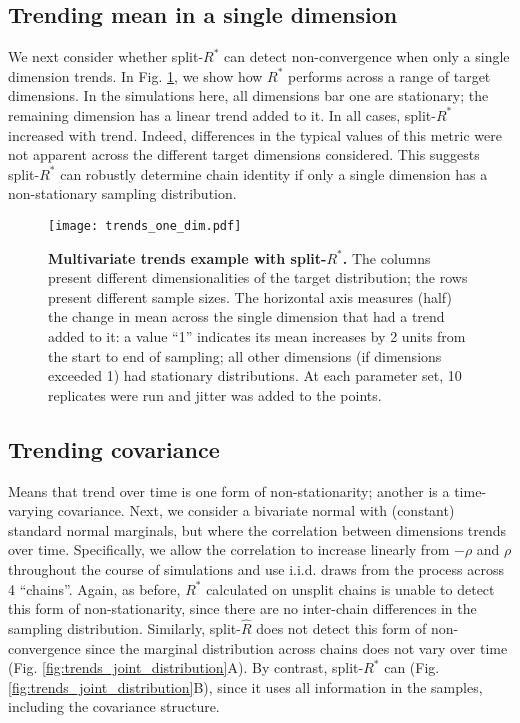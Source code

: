 \documentclass{article}
\begin{document}
\subsection{Trending mean in a single dimension}\label{sec:non-stationary_single}
We next consider whether split-$R^*$ can detect non-convergence when only a single dimension trends. In Fig. \ref{fig:trends_one_dim}, we show how $R^*$ performs across a range of target dimensions. In the simulations here, all dimensions bar one are stationary; the remaining dimension has a linear trend added to it. In all cases, split-$R^*$ increased with trend. Indeed, differences in the typical values of this metric were not apparent across the different target dimensions considered. This suggests split-$R^*$ can robustly determine chain identity if only a single dimension has a non-stationary sampling distribution.


\begin{figure}[!htb]
	\centerline{\texttt{[image: trends\_one\_dim.pdf]}}
	\caption{\textbf{Multivariate trends example with split-$R^*$.} The columns present different dimensionalities of the target distribution; the rows present different sample sizes. The horizontal axis measures (half) the change in mean across the single dimension that had a trend added to it: a value ``1'' indicates its mean increases by 2 units from the start to end of sampling; all other dimensions (if dimensions exceeded 1) had stationary distributions. At each parameter set, 10 replicates were run and jitter was added to the points.}
	\label{fig:trends_one_dim}
\end{figure}

\subsection{Trending covariance}\label{sec:non-stationary_covariance}
Means that trend over time is one form of non-stationarity; another is a time-varying covariance. Next, we consider a bivariate normal with (constant) standard normal marginals, but where the correlation between dimensions trends over time. Specifically, we allow the correlation to increase linearly from $-\rho$ and $\rho$ throughout the course of simulations and use i.i.d. draws from the process across 4 ``chains''. Again, as before, $R^*$ calculated on unsplit chains is unable to detect this form of non-stationarity, since there are no inter-chain differences in the sampling distribution. Similarly, split-$\widehat{R}$ does not detect this form of non-convergence since the marginal distribution across chains does not vary over time (Fig. \ref{fig:trends_joint_distribution}A). By contrast, split-$R^*$ can (Fig. \ref{fig:trends_joint_distribution}B), since it uses all information in the samples, including the covariance structure.
\end{document}

